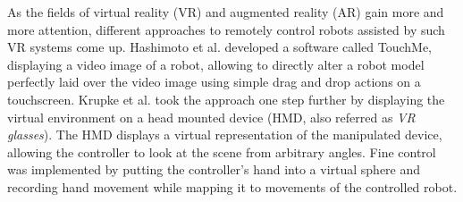 As the fields of virtual reality (VR) and augmented reality (AR) gain more and more attention, different approaches to remotely control robots assisted by such VR systems come up. Hashimoto et al. \cite{Hashimoto2013} developed a software called TouchMe, displaying a video image of a robot, allowing to directly alter a robot model perfectly laid over the video image using simple drag and drop actions on a touchscreen. Krupke et al. \cite{KLBSZ15} took the approach one step further by displaying the virtual environment on a head mounted device (HMD, also referred as \textit{VR glasses}). The HMD displays a virtual representation of the manipulated device, allowing the controller to look at the scene from arbitrary angles. Fine control was implemented by putting the controller's hand into a virtual sphere and recording hand movement while mapping it to movements of the controlled robot.
